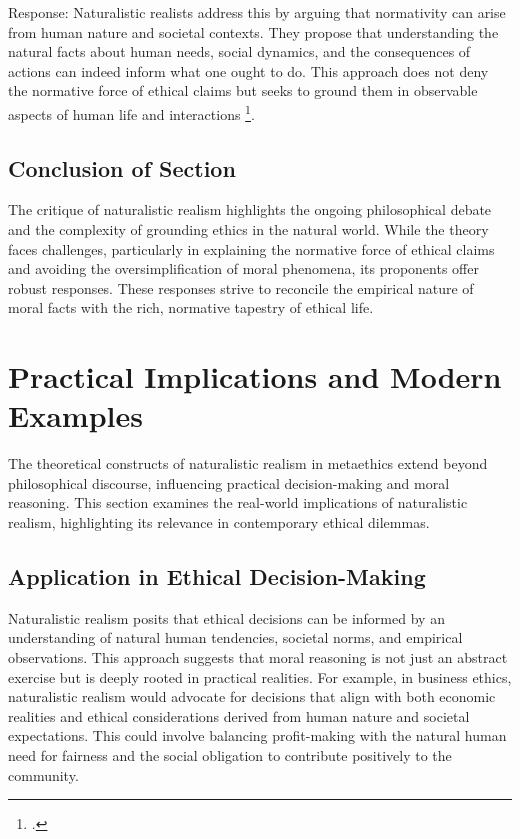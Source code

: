 \documentclass[12pt,a4paper]{article}
\begin{document}
Response: Naturalistic realists address this by arguing that normativity can arise from human nature and societal contexts. They propose that understanding the natural facts about human needs, social dynamics, and the consequences of actions can indeed inform what one ought to do. This approach does not deny the normative force of ethical claims but seeks to ground them in observable aspects of human life and interactions \footcite[339-362]{Stringer2018}.

\subsection{Conclusion of Section}
The critique of naturalistic realism highlights the ongoing philosophical debate and the complexity of grounding ethics in the natural world. While the theory faces challenges, particularly in explaining the normative force of ethical claims and avoiding the oversimplification of moral phenomena, its proponents offer robust responses. These responses strive to reconcile the empirical nature of moral facts with the rich, normative tapestry of ethical life.

\section{Practical Implications and Modern Examples}

The theoretical constructs of naturalistic realism in metaethics extend beyond philosophical discourse, influencing practical decision-making and moral reasoning. This section examines the real-world implications of naturalistic realism, highlighting its relevance in contemporary ethical dilemmas.

\subsection{Application in Ethical Decision-Making}
Naturalistic realism posits that ethical decisions can be informed by an understanding of natural human tendencies, societal norms, and empirical observations. This approach suggests that moral reasoning is not just an abstract exercise but is deeply rooted in practical realities. For example, in business ethics, naturalistic realism would advocate for decisions that align with both economic realities and ethical considerations derived from human nature and societal expectations. This could involve balancing profit-making with the natural human need for fairness and the social obligation to contribute positively to the community.
\end{document}
